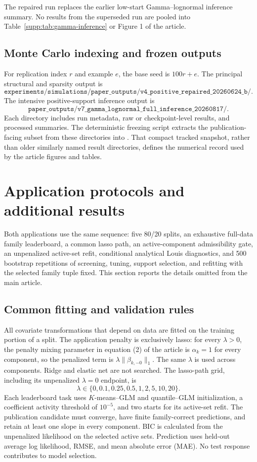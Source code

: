 \documentclass[a4paper,fleqn]{cas-sc}
\numberwithin{equation}{section}
\begin{document}
The repaired run replaces the earlier low-start Gamma--lognormal inference summary. No results from the superseded run are pooled into Table~\ref{supp:tab:gamma-inference} or Figure 1 of the article.

\subsection{Monte Carlo indexing and frozen outputs}

For replication index $r$ and example $e$, the base seed is $100r+e$. The principal structural and sparsity output is
\[
 \texttt{experiments/simulations/paper\_outputs/}\allowbreak
 \texttt{v4\_positive\_repaired\_20260624\_b/}.
\]
The intensive positive-support inference output is
\[
 \texttt{paper\_outputs/v7\_gamma\_lognormal\_full\_inference\_20260817/}.
\]
Each directory includes run metadata, raw or checkpoint-level results, and processed summaries. The deterministic freezing script extracts the publication-facing subset from these directories into . That compact tracked snapshot, rather than older similarly named result directories, defines the numerical record used by the article figures and tables.

\section{Application protocols and additional results}
\label{supp:applications}

Both applications use the same sequence: five 80/20 splits, an exhaustive full-data family leaderboard, a common lasso path, an active-component admissibility gate, an unpenalized active-set refit, conditional analytical Louis diagnostics, and 500 bootstrap repetitions of screening, tuning, support selection, and refitting with the selected family tuple fixed. This section reports the details omitted from the main article.

\subsection{Common fitting and validation rules}

All covariate transformations that depend on data are fitted on the training portion of a split. The application penalty is exclusively lasso: for every $\lambda>0$, the penalty mixing parameter in equation (2) of the article is $\alpha_k=1$ for every component, so the penalized term is $\lambda\lVert\beta_{k,-0}\rVert_1$. The same $\lambda$ is used across components. Ridge and elastic net are not searched. The lasso-path grid, including its unpenalized $\lambda=0$ endpoint, is
\[
 \lambda\in\{0,0.1,0.25,0.5,1,2,5,10,20\}.
\]
Each leaderboard task uses $K$-means--GLM and quantile--GLM initialization, a coefficient activity threshold of $10^{-5}$, and two starts for its active-set refit. The publication candidate must converge, have finite family-correct predictions, and retain at least one slope in every component. BIC is calculated from the unpenalized likelihood on the selected active sets. Prediction uses held-out average log likelihood, RMSE, and mean absolute error (MAE). No test response contributes to model selection.
\end{document}
